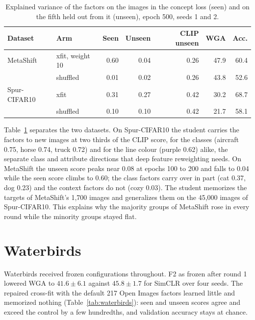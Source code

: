 \documentclass{article}
\begin{document}
\begin{table}[h]
\centering
\caption{Explained variance of the factors on the images in the concept loss (seen) and on the fifth
held out from it (unseen), epoch 500, seeds 1 and 2.}
\label{tab:unseen}
\small
\begin{tabular}{l l r r r r r}
\toprule
Dataset & Arm & Seen & Unseen & CLIP unseen & WGA & Acc. \\
\midrule
MetaShift & xfit, weight 10 & 0.60 & 0.04 & 0.26 & 47.9 & 60.4 \\
 & shuffled & 0.01 & 0.02 & 0.26 & 43.8 & 52.6 \\
Spur-CIFAR10 & xfit & 0.31 & 0.27 & 0.42 & 30.2 & 68.7 \\
 & shuffled & 0.10 & 0.10 & 0.42 & 21.7 & 58.1 \\
\bottomrule
\end{tabular}
\end{table}

Table~\ref{tab:unseen} separates the two datasets. On Spur-CIFAR10 the student carries the factors to new
images at two thirds of the CLIP score, for the classes (aircraft 0.75, horse 0.74, truck 0.72) and for
the line colour (purple 0.62) alike, the separate class and attribute directions that deep feature
reweighting needs. On MetaShift the unseen score peaks near 0.08 at epochs 100 to 200 and falls to 0.04
while the seen score climbs to 0.60; the class factors carry over in part (cat 0.37, dog 0.23) and the
context factors do not (cozy 0.03). The student memorizes the targets of MetaShift's 1,700 images and
generalizes them on the 45,000 images of Spur-CIFAR10. This explains why the majority groups of
MetaShift rose in every round while the minority groups stayed flat.

\section{Waterbirds}
\label{sec:waterbirds}

Waterbirds received frozen configurations throughout. F2 as frozen after round 1 lowered WGA to
$41.6\pm6.1$ against $45.8\pm1.7$ for SimCLR over four seeds. The repaired cross-fit with the default
217 Open Images factors learned little and memorized nothing (Table~\ref{tab:waterbirds}): seen and
unseen scores agree and exceed the control by a few hundredths, and validation accuracy stays at chance.
\end{document}
